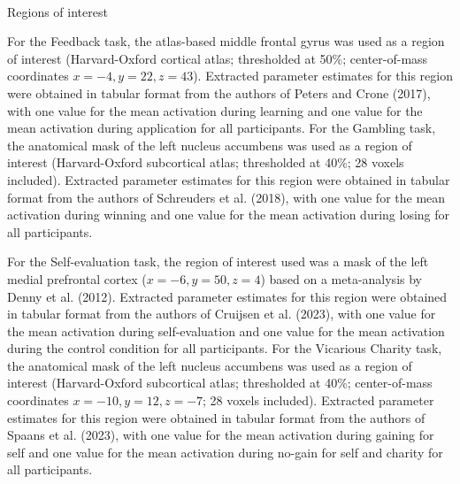 \documentclass[
  letterpaper,
  DIV=11,
  numbers=noendperiod]{scrartcl}
\makeatletter
\let\oldparagraph\paragraph
\renewcommand{\paragraph}{
    \@ifstar
      \xxxParagraphStar
      \xxxParagraphNoStar
  }
\newcommand{\xxxParagraphStar}[1]{\oldparagraph*{#1}\mbox{}}
\newcommand{\xxxParagraphNoStar}[1]{\oldparagraph{#1}\mbox{}}
\makeatother
\begin{document}
\paragraph{Regions of interest}\label{regions-of-interest}

For the Feedback task, the atlas-based middle frontal gyrus was used as
a region of interest (Harvard-Oxford cortical atlas; thresholded at
50\%; center-of-mass coordinates \(x = -4, y = 22, z = 43\)). Extracted
parameter estimates for this region were obtained in tabular format from
the authors of Peters and Crone (2017), with one value for the mean
activation during learning and one value for the mean activation during
application for all participants. For the Gambling task, the anatomical
mask of the left nucleus accumbens was used as a region of interest
(Harvard-Oxford subcortical atlas; thresholded at 40\%; 28 voxels
included). Extracted parameter estimates for this region were obtained
in tabular format from the authors of Schreuders et al. (2018), with one
value for the mean activation during winning and one value for the mean
activation during losing for all participants.

For the Self-evaluation task, the region of interest used was a mask of
the left medial prefrontal cortex (\(x = −6, y = 50, z = 4\)) based on a
meta-analysis by Denny et al. (2012). Extracted parameter estimates for
this region were obtained in tabular format from the authors of Cruijsen
et al. (2023), with one value for the mean activation during
self-evaluation and one value for the mean activation during the control
condition for all participants. For the Vicarious Charity task, the
anatomical mask of the left nucleus accumbens was used as a region of
interest (Harvard-Oxford subcortical atlas; thresholded at 40\%;
center-of-mass coordinates \(x = −10, y = 12, z = −7\); 28 voxels
included). Extracted parameter estimates for this region were obtained
in tabular format from the authors of Spaans et al. (2023), with one
value for the mean activation during gaining for self and one value for
the mean activation during no-gain for self and charity for all
participants.
\end{document}
